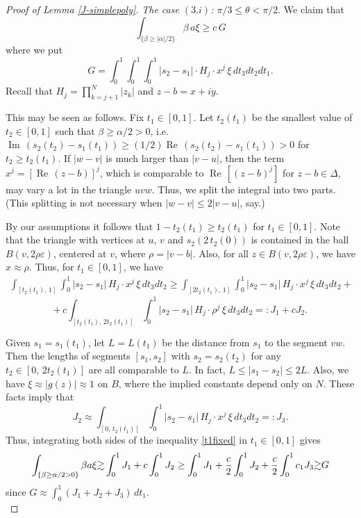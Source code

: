 \documentclass[11 pt]{amsart}
\theoremstyle{plain}
\numberwithin{equation}{section}
\theoremstyle{plain}
\numberwithin{equation}{section}
\theoremstyle{remark}
\begin{document}
\begin{proof}[Proof of Lemma \ref{J-simplepoly}]
{\sl The case $(3.i)$: $\pi/3 \le \theta < \pi/2$}. We claim that
\[ \int_{\{\beta \ge |\alpha|/2 \}} \beta \,a \xi \ge c \,G
\]
where we put
\[ G = \int_0^1 \int_0^1 \int_0^1 |s_2-s_1| \cdot H_j \cdot x^j \, \xi \, dt_3 dt_2 dt_1 .
\]
Recall that $H_j = \prod_{k=j+1}^N |z_k|$ and $z-b = x + i y$.

This may be seen as follows.
Fix $t_1 \in [0,1]$. Let $t_2 (t_1)$ be the smallest value of $t_2 \in [0,1]$ such that $\beta \ge \alpha/2 >0$, i.e. ${\operatorname{Im\,}} (s_2 (t_2) - s_1 (t_1) ) \ge (1/2){\operatorname{Re\,}} (s_2 (t_2) - s_1 (t_1) ) >0$ for $t_2 \ge t_2(t_1)$.
If $|w-v|$ is much larger than $|v-u|$, then the term $x^j = [{\operatorname{Re\,}}(z-b)]^j$, which is comparable to ${\operatorname{Re\,}}[(z-b)^j]$ for $z-b\in \Delta$, may vary a lot in the triangle $uvw$. Thus, we split the integral into two parts. (This splitting is not
necessary when $|w-v| \le 2 |v-u|$, say.)

By our assumptions it follows that $1-t_2(t_1) \ge t_2(t_1)$ for $t_1 \in [0,1]$.
Note that the triangle with vertices at $u$, $v$ and $s_2 (2 \,t_2(0))$ is contained in the ball $B(v, 2 \rho {\varepsilon})$, centered at $v$, where $\rho =|v-b|$. Also, for all $z \in B(v, 2 \rho {\varepsilon})$, we have $x\approx \rho$. Thus, for $t_1\in [0, 1]$, we have
\begin{align}\label{t1fixed}
\int_{[t_2 (t_1),\, 1]} \int_0^1 |s_2 - s_1| \, H_j \cdot x^j \, \xi \, dt_3 dt_2 \ge  \int_{[2 t_2 (t_1),\, 1]} \int_0^1 |s_2 - s_1| \, H_j \cdot x^j \, \xi \, dt_3 dt_2 +
\end{align}
\[ + \, c \int_{[t_2 (t_1),\, 2t_2 (t_1)]} \int_0^1 |s_2 - s_1| \, H_j \cdot \rho^j \, \xi \, dt_3 dt_2 =: J_1 + c J_2 .
\]

Given $s_1=s_1(t_1)$, let $L = L(t_1)$ be the distance from $s_1$ to the segment $vw$. Then the lengths of segments $[s_1, s_2]$ with $s_2 = s_2(t_2)$ for any $t_2 \in [0,\, 2t_2 (t_1)]$ are all comparable to $L$. In fact, $L \le |s_1-s_2| \le 2L$.
Also, we have $\xi \approx |g(z)| \approx 1$ on $B$, where the implied constants depend only on $N$. These facts imply that
\[ J_2 \approx \int_{[0, \,t_2 (t_1)]} \int_0^1 |s_2 - s_1| \,H_j \cdot x^j \,\xi \, dt_3 dt_2 =: J_3
.\]
Thus, integrating both sides of the inequality \eqref{t1fixed} in $t_1 \in [0,1]$ gives
\[ \int_{\{\beta \ge \alpha/2 > 0 \}} \beta a \xi {\gtrsim} \int_0^1 J_1 + c\int_0^1 J_2 \ge \int_0^1 J_1 + {c\over 2} \int_0^1 J_2 + {c\over 2} \int_0^1 c_1 J_3 {\gtrsim} G
\]
since $G \approx \int_0^1 (J_1 + J_2 + J_3) \,dt_1$.
\\


\end{proof}
\end{document}
